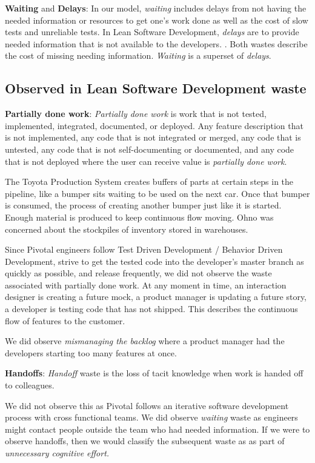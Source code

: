 \textbf{Waiting} and \textbf{Delays}: In our model, \textit{waiting} includes delays from not having the needed information or resources to get one's work done as well as the cost of slow tests and unreliable tests. In Lean Software Development, \textit{delays} are  to provide needed information that is not available to the developers. \cite{PoppendieckConceptToCash}. Both wastes describe the cost of missing needing information. \textit{Waiting} is a superset of \textit{delays}.
\subsection{Observed in Lean Software Development waste}
\textbf{Partially done work}: \textit{Partially done work} is work that is not tested, implemented, integrated, documented, or deployed. Any feature description that is not implemented, any code that is not integrated or merged, any code that is untested, any code that is not self-documenting or documented, and any code that is not deployed where the user can receive value is \textit{partially done work}. 

The Toyota Production System creates buffers of parts at certain steps in the pipeline, like a bumper sits waiting to be used on the next car. Once that bumper is consumed, the process of creating another bumper just like it is started. Enough material is produced to keep continuous flow moving. Ohno was concerned about the stockpiles of inventory stored in warehouses.

Since Pivotal engineers follow Test Driven Development / Behavior Driven Development, strive to get the tested code into the developer's master branch as quickly as possible, and release frequently, we did not observe the waste associated with partially done work. At any moment in time, an interaction designer is creating a future mock, a product manager is updating a future story, a developer is testing code that has not shipped. This describes the continuous flow of features to the customer. 

We did observe \textit{mismanaging the backlog} where a product manager had the developers starting too many features at once.

\textbf{Handoffs}: \textit{Handoff} waste is the loss of tacit knowledge when work is handed off to colleagues.

We did not observe this as Pivotal follows an iterative software development process with cross functional teams. We did observe \textit{waiting} waste as engineers might contact people outside the team who had needed information. If we were to observe handoffs, then we would classify the subsequent waste as  as part of \textit{unnecessary cognitive effort.} 
